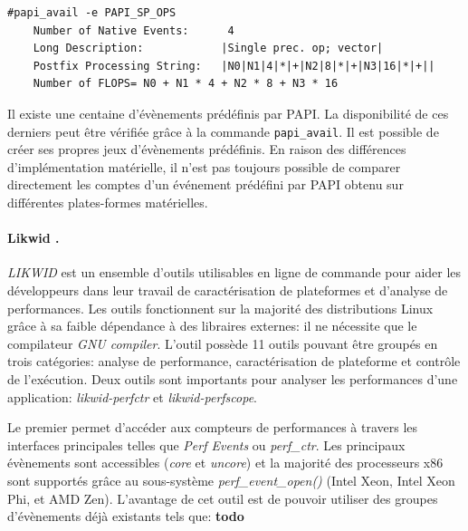 \begin{verbatim}
#papi_avail -e PAPI_SP_OPS
    Number of Native Events:      4
    Long Description:            |Single prec. op; vector|
    Postfix Processing String:   |N0|N1|4|*|+|N2|8|*|+|N3|16|*|+||
    Number of FLOPS= N0 + N1 * 4 + N2 * 8 + N3 * 16
\end{verbatim}

            Il existe une centaine d'évènements prédéfinis par PAPI. La disponibilité de ces derniers peut être vérifiée grâce à la commande \verb|papi_avail|. Il est possible de créer ses propres jeux d'évènements prédéfinis. En raison des différences d'implémentation matérielle, il n'est pas toujours possible de comparer directement les comptes d'un événement prédéfini par PAPI obtenu sur différentes plates-formes matérielles.

        \paragraph{Likwid \cite{Treibig2010}.}
        
            \textit{LIKWID} est un ensemble d'outils utilisables en ligne de commande pour aider les développeurs dans leur travail de caractérisation de plateformes et d'analyse de performances. Les outils fonctionnent sur la majorité des distributions Linux grâce à sa faible dépendance à des libraires externes: il ne nécessite que le compilateur \textit{GNU compiler}. L'outil possède 11 outils pouvant être groupés en trois catégories: analyse de performance, caractérisation de plateforme et contrôle de l'exécution. Deux outils sont importants pour analyser les performances d'une application: \textit{likwid-perfctr} et \textit{likwid-perfscope}.
        
            Le premier permet d'accéder aux compteurs de performances à travers les interfaces principales telles que \textit{Perf Events} ou \textit{perf\_ctr}. Les principaux évènements sont accessibles (\textit{core} et \textit{uncore}) et la majorité des processeurs x86 sont supportés grâce au sous-système \textit{perf\_event\_open()} (Intel Xeon, Intel Xeon Phi, et AMD Zen). L'avantage de cet outil est de pouvoir utiliser des groupes d'évènements déjà existants tels que:
\textbf{todo}

